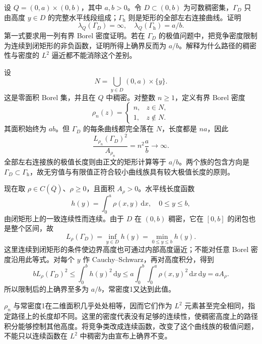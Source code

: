 \begin{exercise}\label{b3:ex:08-7}
设 \(Q=(0,a)\times(0,b)\)，其中 \(a,b>0\)。令 \(D\subset(0,b)\) 为可数稠密集，\(\Gamma_D\) 只由高度 \(y\in D\) 的完整水平线段组成；\(\Gamma_{\mathrm h}\) 则是矩形的全部左右连接曲线。证明
\[
 \lambda_Q(\Gamma_D)=\infty,\quad
 \lambda_Q(\Gamma_{\mathrm h})=a/b.
\]
第一式要求用一列有界 Borel 密度证明。若在 \(\Gamma_D\) 的极值问题中，把竞争密度限制为连续到闭矩形的非负函数，证明所得上确界反而为 \(a/b\)。解释为什么路径的稠密性与密度的 \(L^2\) 逼近都不能消除这个差别。
\end{exercise}
\begin{solution}
设
\[
 N=\bigcup_{y\in D}(0,a)\times\{y\}.
\]
这是零面积 Borel 集，并且在 \(Q\) 中稠密。对整数 \(n\ge1\)，定义有界 Borel 密度
\[
 \rho_n(z)=\begin{cases}n,&z\in N,\\1,&z\notin N.\end{cases}
\]
其面积始终为 \(ab\)。但 \(\Gamma_D\) 的每条曲线都完全落在 \(N\)，长度都是 \(na\)，因此
\[
 \frac{L_{\rho_n}(\Gamma_D)^2}{A_{\rho_n}}
 =n^2\frac ab\longrightarrow\infty.
\]
全部左右连接族的极值长度则由正文的矩形计算等于 \(a/b\)。两个族的包含方向是
\(\Gamma_D\subset\Gamma_{\mathrm h}\)，故无穷值与有限值正符合较小曲线族具有较大极值长度的原则。

现在取 \(\rho\in C(\overline Q)\)、\(\rho\ge0\)，且面积 \(A_\rho>0\)。水平线长度函数
\[
 h(y)=\int_0^a\rho(x,y)\,\mathrm{d}x,\quad0\le y\le b,
\]
由闭矩形上的一致连续性而连续。由于 \(D\) 在 \((0,b)\) 稠密，它在 \([0,b]\) 的闭包也是整个区间，故
\[
 L_\rho(\Gamma_D)=\inf_{y\in D}h(y)
 =\min_{0\le y\le b}h(y).
\]
这里连续到闭矩形的条件使边界高度也可通过内部高度逼近；不能对任意 Borel 密度沿用此等式。对每个 \(y\) 作 Cauchy--Schwarz，再对高度积分，得到
\[
 bL_\rho(\Gamma_D)^2
 \le\int_0^b h(y)^2\,\mathrm{d}y
 \le a\int_0^b\int_0^a\rho(x,y)^2\,\mathrm{d}x\,\mathrm{d}y
 =aA_\rho.
\]
所以限制后的上确界至多为 \(a/b\)，常密度1又达到此值。

\(\rho_n\) 与常密度1在二维面积几乎处处相等，因而它们作为 \(L^2\) 元素甚至完全相同，指定路径上的长度却不同。这里的密度代表没有足够的连续性，使稠密高度上的路径积分能够控制其他高度。将竞争类改成连续函数，改变了这个曲线族的极值问题，不能只以连续函数在 \(L^2\) 中稠密为由宣布上确界不变。
\end{solution}

